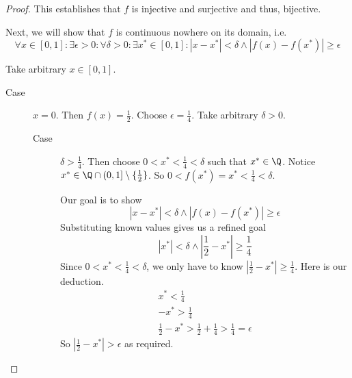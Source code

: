 \documentclass[letterpaper,11pt]{article}
\newcommand{\abs}[1]{\left|#1\right|}
\newcommand{\intersn}{\cap}
\newcommand{\half}{\frac{1}{2}}
\newcommand{\quarter}{\frac{1}{4}}
\begin{document}
\begin{proof}
    This establishes that $f$ is injective and surjective and thus, bijective.

    Next, we will show that $f$ is continuous nowhere on its domain, i.e.
    \begin{equation*}
        \forall x \in [0, 1]:
        \exists \epsilon > 0:
        \forall \delta > 0:
        \exists x^* \in [0, 1]:
        \abs{x - x^*} < \delta \land \abs{f(x) - f(x^*)} \geq \epsilon
    \end{equation*}

    Take arbitrary $x \in [0,1]$.
    \begin{description}
        \item[Case] $x = 0$.
            Then $f(x) = \half$.
            Choose $\epsilon = \quarter$.
            Take arbitrary $\delta > 0$.
            \begin{description}
                \item[Case] $\delta > \quarter$.
                    Then choose $0 < x^* < \quarter < \delta$
                    such that $x^* \in \Q$.
                    Notice $x^* \in \Q \intersn (0, 1] \setminus \{\half\}$.
                    So $0 < f(x^*) = x^* < \quarter < \delta$.

                    Our goal is to show
                    \begin{equation*}
                        \abs{x - x^*} < \delta
                        \land \abs{f(x) - f(x^*)} \geq \epsilon
                    \end{equation*}
                    Substituting known values gives us a refined goal
                    \begin{equation*}
                        \abs{x^*} < \delta
                        \land
                        \abs{\half - x^*} \geq \quarter
                    \end{equation*}
                    Since $0 < x^* < \quarter < \delta$, we only have to know
                    $\abs{\half - x^*} \geq \quarter$.
                    Here is our deduction.
                    \begin{align*}
                        x^* < \quarter \\
                        -x^* > \quarter \\
                        \half - x^* > \half + \quarter > \quarter = \epsilon
                    \end{align*}
                    So $\abs{\half - x^*} > \epsilon$ as required.


\end{description}
\end{description}
\end{proof}
\end{document}
